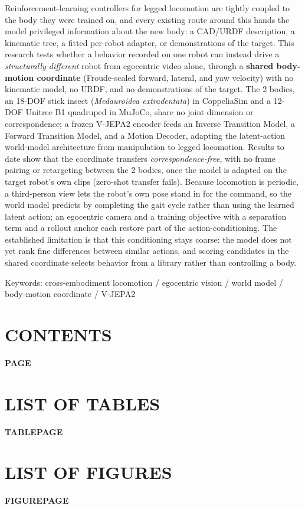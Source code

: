 \documentclass[12pt,a4paper,oneside]{report}
\makeatletter
\renewcommand{\@dotsep}{10000}
\renewcommand{\listtablename}{LIST OF TABLES}
\renewcommand{\listfigurename}{LIST OF FIGURES}
\renewcommand\listoftables{%
  \chapter*{\listtablename}%
  \noindent\textbf{TABLE}\hfill\textbf{PAGE}\par\nobreak\vspace{2pt}%
  \@starttoc{lot}%
}
\renewcommand\listoffigures{%
  \chapter*{\listfigurename}%
  \noindent\textbf{FIGURE}\hfill\textbf{PAGE}\par\nobreak\vspace{2pt}%
  \@starttoc{lof}%
}
\renewcommand{\contentsname}{CONTENTS}
\renewcommand\tableofcontents{%
  \chapter*{\contentsname}%
  \noindent\hfill\textbf{PAGE}\par\nobreak\vspace{2pt}%
  \@starttoc{toc}%
}
\makeatother
\begin{document}
\noindent Reinforcement-learning controllers for legged locomotion are tightly coupled to the body they were
trained on, and every existing route around this hands the model privileged information about the new body: a
CAD/URDF description, a kinematic tree, a fitted per-robot adapter, or demonstrations of the target. This research
tests whether a behavior recorded on one robot can instead drive a \emph{structurally different} robot from
egocentric video alone, through a \textbf{shared body-motion coordinate} (Froude-scaled forward, lateral, and yaw
velocity) with no kinematic model, no URDF, and no demonstrations of the target. The 2 bodies, an 18-DOF stick
insect (\emph{Medauroidea extradentata}) in CoppeliaSim and a 12-DOF Unitree B1 quadruped in MuJoCo, share no
joint dimension or correspondence; a frozen V-JEPA2 encoder feeds an Inverse Transition Model, a Forward
Transition Model, and a Motion Decoder, adapting the latent-action world-model architecture from manipulation to
legged locomotion. Results to date show that the coordinate transfers \emph{correspondence-free}, with no frame pairing or retargeting
between the 2 bodies, once the model is adapted on the target robot's own clips (zero-shot transfer fails). Because
locomotion is periodic, a third-person view lets the robot's own pose stand in for the command, so the world model
predicts by completing the gait cycle rather than using the learned latent action; an egocentric camera and a training
objective with a separation term and a rollout anchor each restore part of the action-conditioning. The established
limitation is that this conditioning stays coarse: the model does not yet rank fine differences between similar
actions, and scoring candidates in the shared coordinate selects behavior from a library rather than controlling a
body.

\vspace{4mm}
\noindent Keywords: cross-embodiment locomotion / egocentric vision / world model / body-motion coordinate / V-JEPA2


\begingroup
\makeatletter
\renewcommand{\@dotsep}{2}%
\makeatother
\setlength{\parskip}{2pt}%
\linespread{1.0}\selectfont
\tableofcontents
\endgroup
\thispagestyle{fancy}
\begingroup
\makeatletter
\renewcommand{\addvspace}[1]{}%
\renewcommand{\@dotsep}{2}%
\makeatother
\listoftables
\thispagestyle{fancy}
\listoffigures
\thispagestyle{fancy}
\endgroup
\end{document}
